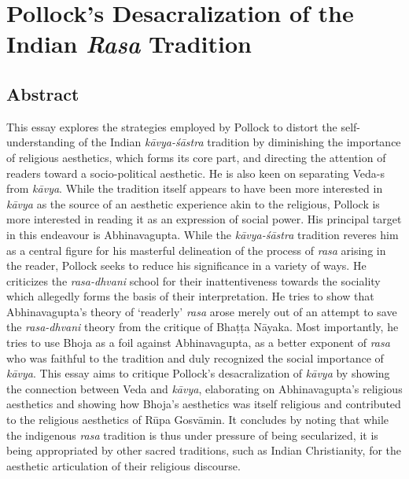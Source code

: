 \chapter[Pollock’s Desacralization of the Indian {\sl Rasa} Tradition]{Pollock’s Desacralization of the Indian \textsl{Rasa} Tradition}\label{chapter\thechapter:begin}

\section*{Abstract}

This essay explores the strategies employed by Pollock to distort the self-understanding of the Indian {\sl kāvya-śāstra} tradition by diminishing the importance of religious aesthetics, which forms its core part, and directing the attention of readers toward a socio-political aesthetic. He is also keen on separating Veda-s from {\sl kāvya}. While the tradition itself appears to have been more interested in {\sl kāvya} as the source of an aesthetic experience akin to the religious, Pollock is more interested in reading it as an expression of social power. His principal target in this endeavour is Abhinavagupta. While the {\sl kāvya-śāstra} tradition reveres him as a central figure for his masterful delineation of the process of {\sl rasa} arising in the reader, Pollock seeks to reduce his significance in a variety of ways. He criticizes the {\sl rasa-dhvani} school for their inattentiveness towards the sociality which allegedly forms the basis of their interpretation. He tries to show that Abhinavagupta's theory of `readerly' {\sl rasa} arose merely out of an attempt to save the {\sl rasa-dhvani} theory from the critique of Bhaṭṭa Nāyaka. Most importantly, he tries to use Bhoja as a foil against Abhinavagupta, as a better exponent of {\sl rasa} who was faithful to the tradition and duly recognized the social importance of {\sl kāvya}. This essay aims to critique Pollock's desacralization of {\sl kāvya} by showing the connection between Veda and {\sl kāvya}, elaborating on Abhinavagupta's religious aesthetics and showing how Bhoja's aesthetics was itself religious and contributed to the religious aesthetics of Rūpa Gosvāmin. It concludes by noting that while the indigenous {\sl rasa} tradition is thus under pressure of being secularized, it is being appropriated by other sacred traditions, such as Indian Christianity, for the aesthetic articulation of their religious discourse.

